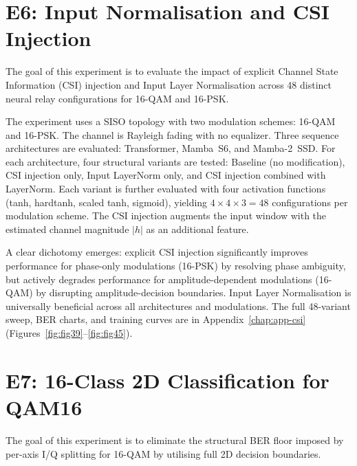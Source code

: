 \section{E6: Input Normalisation and CSI Injection}\label{sec:input-normalization-and-csi-injection}

The goal of this experiment is to evaluate the impact of explicit Channel State
Information (CSI) injection and Input Layer Normalisation across 48 distinct neural
relay configurations for 16-QAM and 16-PSK.

The experiment uses a SISO topology with two modulation schemes: 16-QAM and 16-PSK.
The channel is Rayleigh fading with no equalizer. Three sequence architectures are
evaluated: Transformer, Mamba~S6, and Mamba-2~SSD. For each architecture, four
structural variants are tested: Baseline (no modification), CSI injection only, Input
LayerNorm only, and CSI injection combined with LayerNorm. Each variant is further
evaluated with four activation functions (tanh, hardtanh, scaled tanh, sigmoid),
yielding $4 \times 4 \times 3 = 48$ configurations per modulation scheme. The CSI
injection augments the input window with the estimated channel magnitude $|h|$ as an
additional feature.

A clear dichotomy emerges: explicit CSI injection significantly improves performance
for phase-only modulations (16-PSK) by resolving phase ambiguity, but actively
degrades performance for amplitude-dependent modulations (16-QAM) by disrupting
amplitude-decision boundaries. Input Layer Normalisation is universally beneficial
across all architectures and modulations.
The full 48-variant sweep, BER charts, and training curves are in
Appendix~\ref{chap:app-csi}
(Figures~\ref{fig:fig39}--\ref{fig:fig45}).

\section{E7: 16-Class 2D Classification for QAM16}\label{sec:class-2d-classification-for-qam16}

The goal of this experiment is to eliminate the structural BER floor imposed by
per-axis I/Q splitting for 16-QAM by utilising full 2D decision boundaries.

